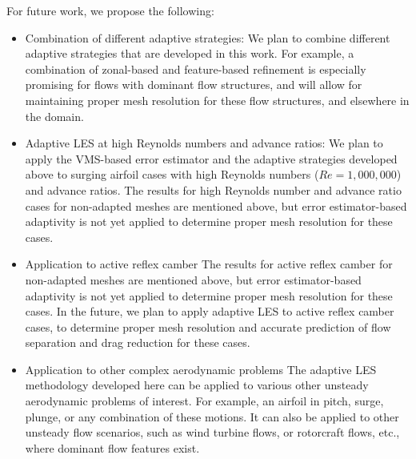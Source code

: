 For future work, we propose the following:

\begin{itemize}
	\item Combination of different adaptive strategies:
	We plan to combine different adaptive strategies that are developed in this work. For example, a combination of zonal-based and feature-based refinement is especially promising for flows with dominant flow structures, and will allow for maintaining proper mesh resolution for these flow structures, and elsewhere in the domain.
	
	\item Adaptive LES at high Reynolds numbers and advance ratios:
	We plan to apply the VMS-based error estimator and the adaptive strategies developed above to
	surging airfoil cases with high Reynolds numbers ($Re=1,000,000$) and advance ratios. The results for high Reynolds number and advance ratio cases for non-adapted meshes are mentioned above, but error estimator-based adaptivity is not yet applied to determine proper mesh resolution for these cases.
	
	\item Application to active reflex camber
	The results for active reflex camber for non-adapted meshes are mentioned above, but error estimator-based	adaptivity is not yet applied to determine proper mesh resolution for these cases. In the future, we plan to apply adaptive LES to active reflex camber cases, to determine proper mesh resolution and accurate prediction of flow separation and drag reduction for these cases.
	
	\item Application to other complex aerodynamic problems
	The adaptive LES methodology developed here can be applied to various other unsteady aerodynamic problems of interest. For example, an airfoil in pitch, surge, plunge, or any combination of these motions.
	It can also be applied to other unsteady flow scenarios, such as wind turbine flows, or rotorcraft flows, etc., where dominant flow features exist. 
	
	
	
\end{itemize}
